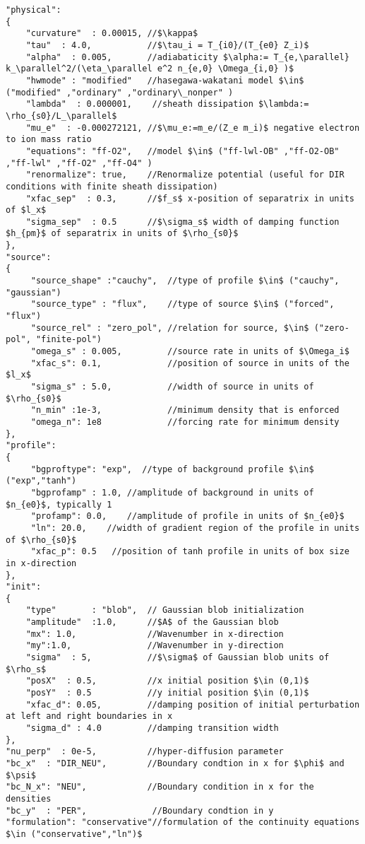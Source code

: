 \begin{verbatim}
"physical":
{
    "curvature"  : 0.00015, //$\kappa$
    "tau"  : 4.0,           //$\tau_i = T_{i0}/(T_{e0} Z_i)$
    "alpha"  : 0.005,       //adiabaticity $\alpha:= T_{e,\parallel} k_\parallel^2/(\eta_\parallel e^2 n_{e,0} \Omega_{i,0} )$
    "hwmode" : "modified"   //hasegawa-wakatani model $\in$ ("modified" ,"ordinary" ,"ordinary\_nonper" )
    "lambda"  : 0.000001,    //sheath dissipation $\lambda:= \rho_{s0}/L_\parallel$
    "mu_e"  : -0.000272121, //$\mu_e:=m_e/(Z_e m_i)$ negative electron to ion mass ratio
    "equations": "ff-O2",   //model $\in$ ("ff-lwl-OB" ,"ff-O2-OB" ,"ff-lwl" ,"ff-O2" ,"ff-O4" )
    "renormalize": true,    //Renormalize potential (useful for DIR conditions with finite sheath dissipation)
    "xfac_sep"  : 0.3,      //$f_s$ x-position of separatrix in units of $l_x$     
    "sigma_sep"  : 0.5      //$\sigma_s$ width of damping function $h_{pm}$ of separatrix in units of $\rho_{s0}$    
},
"source":
{
     "source_shape" :"cauchy",  //type of profile $\in$ ("cauchy", "gaussian")
     "source_type" : "flux",    //type of source $\in$ ("forced", "flux")
     "source_rel" : "zero_pol", //relation for source, $\in$ ("zero-pol", "finite-pol")
     "omega_s" : 0.005,         //source rate in units of $\Omega_i$
     "xfac_s": 0.1,             //position of source in units of the $l_x$
     "sigma_s" : 5.0,           //width of source in units of $\rho_{s0}$
     "n_min" :1e-3,             //minimum density that is enforced
     "omega_n": 1e8             //forcing rate for minimum density 
},
"profile":
{
     "bgproftype": "exp",  //type of background profile $\in$ ("exp","tanh")
     "bgprofamp" : 1.0, //amplitude of background in units of $n_{e0}$, typically 1
     "profamp": 0.0,    //amplitude of profile in units of $n_{e0}$
     "ln": 20.0,    //width of gradient region of the profile in units of $\rho_{s0}$
     "xfac_p": 0.5   //position of tanh profile in units of box size in x-direction
},
"init":
{
    "type"       : "blob",  // Gaussian blob initialization
    "amplitude"  :1.0,      //$A$ of the Gaussian blob
    "mx": 1.0,              //Wavenumber in x-direction
    "my":1.0,               //Wavenumber in y-direction
    "sigma"  : 5,           //$\sigma$ of Gaussian blob units of $\rho_s$
    "posX"  : 0.5,          //x initial position $\in (0,1)$
    "posY"  : 0.5           //y initial position $\in (0,1)$
    "xfac_d": 0.05,         //damping position of initial perturbation at left and right boundaries in x
    "sigma_d" : 4.0         //damping transition width
},
"nu_perp"  : 0e-5,          //hyper-diffusion parameter
"bc_x"  : "DIR_NEU",        //Boundary condtion in x for $\phi$ and $\psi$
"bc_N_x": "NEU",            //Boundary condition in x for the densities
"bc_y"  : "PER",             //Boundary condtion in y
"formulation": "conservative"//formulation of the continuity equations $\in ("conservative","ln")$
\end{verbatim}
